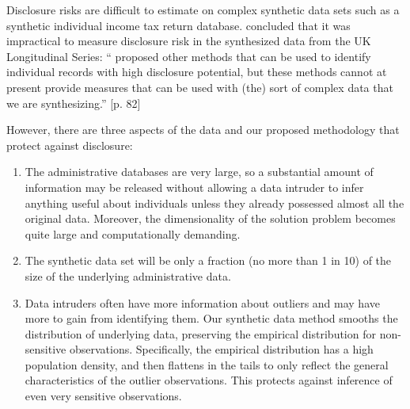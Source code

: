 \documentclass[11pt,runningheads,oribibl]{llncs}
\begin{document}

Disclosure risks are difficult to estimate on complex synthetic data sets such as a synthetic individual income tax return database. \cite{raab2016practical} concluded that it was impractical to measure disclosure risk in the synthesized data from the UK Longitudinal Series: ``\cite{hu2014disclosure, reiter2014bayesian,mcclure2012differential} proposed other methods that can be used to identify individual records with high disclosure potential, but these methods cannot at present provide measures that can be used with (the) sort of complex data that we are synthesizing.'' [p. 82]

However, there are three aspects of the data and our proposed methodology that protect against disclosure: 
\begin{enumerate}
    \item The administrative databases are very large, so a substantial amount of information may be released without allowing a data intruder to infer anything useful about individuals unless they already possessed almost all the original data. Moreover, the dimensionality of the solution problem becomes quite large and computationally demanding.
    \item The synthetic data set will be only a fraction (no more than 1 in 10) of the size of the underlying administrative data.
    \item Data intruders often have more information about outliers and may have more to gain from identifying them. Our synthetic data method smooths the distribution of underlying data, preserving the empirical distribution for non-sensitive observations. Specifically, the empirical distribution has a high population density, and then flattens in the tails to only reflect the general characteristics of the outlier observations. This protects against inference of even very sensitive observations.
\end{enumerate}
\end{document}
